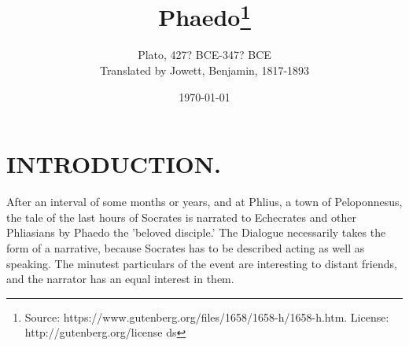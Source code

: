 \documentclass[11pt,letter]{article}
\begin{document}
\title{Phaedo\thanks{Source: https://www.gutenberg.org/files/1658/1658-h/1658-h.htm. License: http://gutenberg.org/license ds}}
\date{\today}
\author{Plato, 427? BCE-347? BCE\\ Translated by Jowett, Benjamin, 1817-1893}
\maketitle

\setcounter{tocdepth}{1}
\tableofcontents
\renewcommand{\baselinestretch}{1.0}
\normalsize
\newpage

\section{
      INTRODUCTION.
    }
\par  After an interval of some months or years, and at Phlius, a town of Peloponnesus, the tale of the last hours of Socrates is narrated to Echecrates and other Phliasians by Phaedo the 'beloved disciple.' The Dialogue necessarily takes the form of a narrative, because Socrates has to be described acting as well as speaking. The minutest particulars of the event are interesting to distant friends, and the narrator has an equal interest in them.
\end{document}
